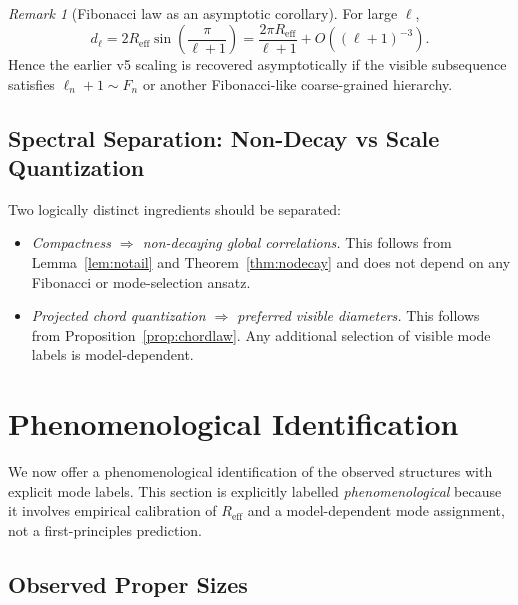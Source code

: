 \documentclass[
  aps,
  prd,
  reprint,
  superscriptaddress,
  nofootinbib,
  longbibliography,
  floatfix,
  amsmath,
  amssymb
]{revtex4-2}
\theoremstyle{plain}
\theoremstyle{definition}
\theoremstyle{remark}
\newtheorem{remark}[theorem]{Remark}
\newcommand{\Reff}{R_{\mathrm{eff}}}
\begin{document}
\begin{remark}[Fibonacci law as an asymptotic corollary]
  For large $\ell$,
  \begin{equation}
    d_\ell
    = 2\Reff \sin\!\left(\frac{\pi}{\ell+1}\right)
    = \frac{2\pi\Reff}{\ell+1} + O\!\left((\ell+1)^{-3}\right).
  \end{equation}
  Hence the earlier v5 scaling is recovered asymptotically if the
  visible subsequence satisfies $\ell_n+1\sim F_n$ or another
  Fibonacci-like coarse-grained hierarchy.
\end{remark}

\subsection{Spectral Separation: Non-Decay vs Scale Quantization}

Two logically distinct ingredients should be separated:
\begin{itemize}[noitemsep]
\item \emph{Compactness $\Rightarrow$ non-decaying global
  correlations.} This follows from Lemma~\ref{lem:notail} and
  Theorem~\ref{thm:nodecay} and does not depend on any Fibonacci or
  mode-selection ansatz.
\item \emph{Projected chord quantization $\Rightarrow$ preferred visible
  diameters.} This follows from Proposition~\ref{prop:chordlaw}. Any
  additional selection of visible mode labels is model-dependent.
\end{itemize}

\section{Phenomenological Identification}
\label{sec:identification}

We now offer a phenomenological identification of the observed
structures with explicit mode labels. This section is explicitly labelled
\emph{phenomenological} because it involves empirical calibration of
$\Reff$ and a model-dependent mode assignment, not a first-principles
prediction.

\subsection{Observed Proper Sizes}
\end{document}

